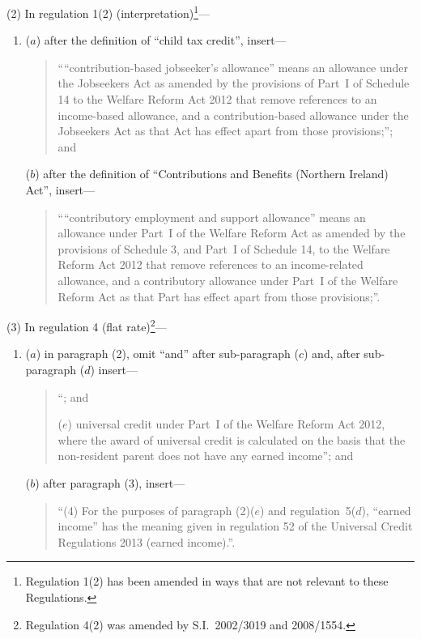 \documentclass[12pt,a4paper]{article}
\begin{document}
(2) In regulation 1(2) (interpretation)\footnote{Regulation 1(2) has been amended in ways that are not relevant to these Regulations.}—
\begin{enumerate}\item[]
($a$) after the definition of “child tax credit”, insert—
\begin{quotation}
““contribution-based jobseeker’s allowance” means an allowance under the Jobseekers Act as amended by the provisions of Part~I of Schedule 14 to the Welfare Reform Act 2012 that remove references to an income-based allowance, and a contribution-based allowance under the Jobseekers Act as that Act has effect apart from those provisions;”; and
\end{quotation}

($b$) after the definition of “Contributions and Benefits (Northern Ireland) Act”, insert—
\begin{quotation}
““contributory employment and support allowance” means an allowance under Part~I of the Welfare Reform Act as amended by the provisions of Schedule 3, and Part~I of Schedule 14, to the Welfare Reform Act 2012 that remove references to an income-related allowance, and a contributory allowance under Part~I of the Welfare Reform Act as that Part has effect apart from those provisions;”.
\end{quotation}
\end{enumerate}

(3) In regulation 4 (flat rate)\footnote{Regulation 4(2) was amended by S.I.~2002/3019 and 2008/1554.}—
\begin{enumerate}\item[]
($a$) in paragraph (2), omit “and” after sub-paragraph ($c$)  and, after sub-paragraph ($d$)  insert—
\begin{quotation}
“; and

($e$) universal credit under Part~I of the Welfare Reform Act 2012, where the award of universal credit is calculated on the basis that the non-resident parent does not have any earned income”; and
\end{quotation}

($b$) after paragraph (3), insert—
\begin{quotation}
“(4) For the purposes of paragraph (2)($e$)  and regulation~5($d$), “earned income” has the meaning given in regulation 52 of the Universal Credit Regulations 2013 (earned income).”.
\end{quotation}
\end{enumerate}
\end{document}
